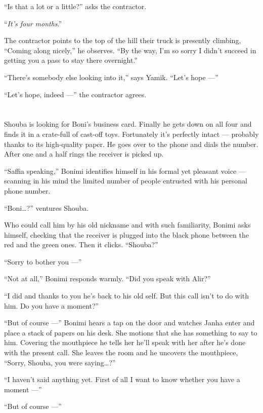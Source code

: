 \documentclass[twoside,11pt,openany]{book}
\begin{document}
``Is that a lot or a little?'' asks the contractor.

``\textit{It's four months}.''

The contractor points to the top of the hill their truck is presently climbing, ``Coming along nicely,'' he
observes. ``By the way, I'm so sorry I didn't succeed in getting you a pass to stay there overnight.''

``There's somebody else looking into it,'' says Yamik. ``Let's hope ---''

``Let's hope, indeed ---'' the contractor agrees.


\chapter{}

Shouba is looking for Boni's business card. Finally he gets down on all four and finds it in a crate-full of cast-off
toys. Fortunately it's perfectly intact ---  probably thanks to its high-quality paper. He goes over to the phone and
dials the number. After one and a half rings the receiver is picked up.

``Saffia speaking,'' Bonimi identifies himself in his formal yet pleasant voice --- scanning in
his mind the limited number of people entrusted with his personal phone number.

``Boni{\ldots}?'' ventures Shouba.

Who could call him by his old nickname and with such familiarity, Bonimi asks himself, checking that the receiver is
plugged into the black phone between the red and the green ones. Then it clicks. ``Shouba?''

``Sorry to bother you ---''

``Not at all,'' Bonimi responds warmly. ``Did you speak with Alir?''

``I did and thanks to you he's back to his old self. But this call isn't to do with him. Do you have a
moment?''

``But of course ---'' Bonimi hears a tap on the door and watches Janha enter and place a stack
of papers on his desk. She motions that she has something to say to him. Covering the mouthpiece he tells her he'll
speak with her after he's done with the present call. She leaves the room and he uncovers the mouthpiece,
``Sorry, Shouba, you were saying{\ldots}?''

``I haven't said anything yet. First of all I want to know whether you have a moment ---''

``But of course ---''
\end{document}
